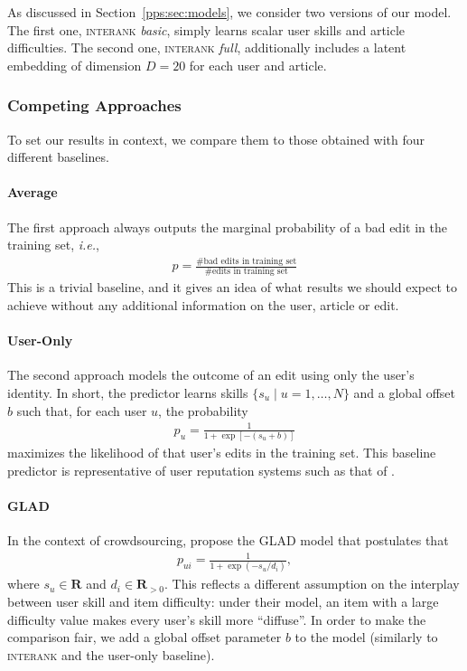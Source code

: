 As discussed in Section~\ref{pps:sec:models}, we consider two versions of our model.
The first one, \textsc{interank} \emph{basic}, simply learns scalar user skills and article difficulties.
The second one, \textsc{interank} \emph{full}, additionally includes a latent embedding of dimension $D = 20$ for each user and article.

\subsubsection{Competing Approaches}
\label{pps:sec:wikicompeting}
To set our results in context, we compare them to those obtained with four different baselines.

\paragraph{Average}
The first approach always outputs the marginal probability of a bad edit in the training set, \textit{i.e.},
\begin{align*}
	p = \frac{\text{\# bad edits in training set}}{\text{\# edits in training set}}
\end{align*}
This is a trivial baseline, and it gives an idea of what results we should expect to achieve without any additional information on the user, article or edit.

\paragraph{User-Only}
The second approach models the outcome of an edit using only the user's identity.
In short, the predictor learns skills $\{s_u \mid u = 1, \ldots, N\}$ and a global offset $b$ such that, for each user $u$, the probability
\begin{align*}
	p_u = \frac{1}{1 + \exp[- (s_u + b)]}
\end{align*}
maximizes the likelihood of that user's edits in the training set.
This baseline predictor is representative of user reputation systems such as that of \citet{adler2007content}.

\paragraph{GLAD}
In the context of crowdsourcing, \citet{whitehill2009whose} propose the GLAD model that postulates that
\begin{align*}
	p_{ui} = \frac{1}{1 + \exp(- s_u / d_i)},
\end{align*}
where $s_u \in \mathbf{R}$ and $d_i \in \mathbf{R}_{>0}$.
This reflects a different assumption on the interplay between user skill and item difficulty: under their model, an item with a large difficulty value makes every user's skill more ``diffuse''.
In order to make the comparison fair, we add a global offset parameter $b$ to the model (similarly to \textsc{interank} and the user-only baseline).


